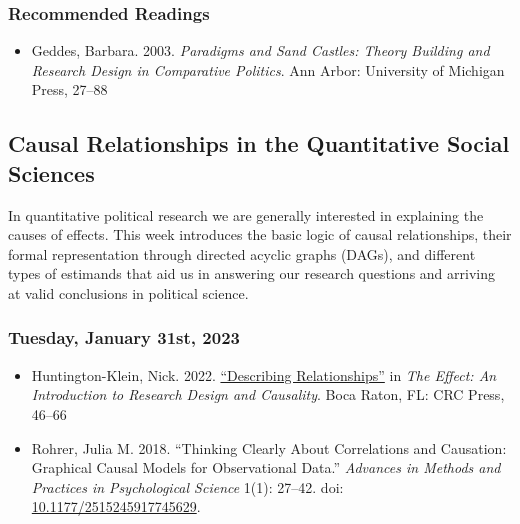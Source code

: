 \documentclass[12pt,]{article}
\providecommand{\tightlist}{%
  \setlength{\itemsep}{0pt}\setlength{\parskip}{0pt}}
\begin{document}
\hypertarget{recommended-readings}{%
\subsubsection{Recommended Readings}\label{recommended-readings}}

\begin{itemize}
\tightlist
\item
  Geddes, Barbara. 2003. \emph{Paradigms and Sand Castles: Theory
  Building and Research Design in Comparative Politics}. Ann Arbor:
  University of Michigan Press, 27--88
\end{itemize}

\hypertarget{causal-relationships-in-the-quantitative-social-sciences}{%
\subsection{Causal Relationships in the Quantitative Social
Sciences}\label{causal-relationships-in-the-quantitative-social-sciences}}

\noindent In quantitative political research we are generally interested
in explaining the causes of effects. This week introduces the basic
logic of causal relationships, their formal representation through
directed acyclic graphs (DAGs), and different types of estimands that
aid us in answering our research questions and arriving at valid
conclusions in political science.

\hypertarget{tuesday-january-31st-2023}{%
\subsubsection{Tuesday, January 31st,
2023}\label{tuesday-january-31st-2023}}

\begin{itemize}
\item
  Huntington-Klein, Nick. 2022.
  \href{https://theeffectbook.net/ch-DescribingRelationships.html}{``Describing
  Relationships''} in \emph{The Effect: An Introduction to Research
  Design and Causality}. Boca Raton, FL: CRC Press, 46--66
\item
  Rohrer, Julia M. 2018. ``Thinking Clearly About Correlations and
  Causation: Graphical Causal Models for Observational Data.''
  \emph{Advances in Methods and Practices in Psychological Science}
  1(1): 27--42. doi:
  \href{https://doi.org/10.1177/2515245917745629}{10.1177/2515245917745629}.
\end{itemize}
\end{document}
